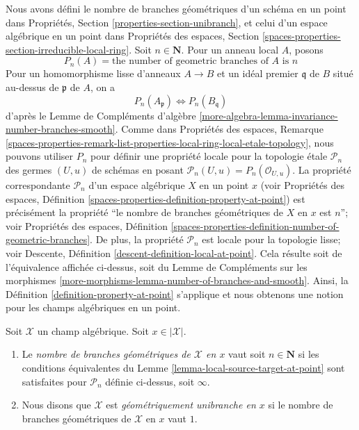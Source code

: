 \noindent
Nous avons défini le nombre de branches géométriques d'un schéma en un point
dans Propriétés, Section \ref{properties-section-unibranch},
et celui d'un espace algébrique en un point dans Propriétés des espaces, Section
\ref{spaces-properties-section-irreducible-local-ring}.
Soit $n \in \mathbf{N}$. Pour un anneau local $A$, posons
$$
P_n(A) = \text{the number of geometric branches of }A\text{ is }n
$$
Pour un homomorphisme lisse d'anneaux $A \to B$ et un idéal premier $\mathfrak q$
de $B$ situé au-dessus de $\mathfrak p$ de $A$, on a
$$
P_n(A_\mathfrak p) \Leftrightarrow P_n(B_\mathfrak q)
$$
d'après le Lemme de Compléments d'algèbre
\ref{more-algebra-lemma-invariance-number-branches-smooth}.
Comme dans Propriétés des espaces, Remarque
\ref{spaces-properties-remark-list-properties-local-ring-local-etale-topology},
nous pouvons utiliser $P_n$ pour définir une propriété locale pour la topologie \'etale $\mathcal{P}_n$
des germes $(U, u)$ de schémas en posant
$\mathcal{P}_n(U, u) = P_n(\mathcal{O}_{U, u})$.
La propriété correspondante $\mathcal{P}_n$
d'un espace algébrique $X$ en un point $x$
(voir Propriétés des espaces, Définition
\ref{spaces-properties-definition-property-at-point})
est précisément la propriété
``le nombre de branches géométriques de $X$ en $x$ est $n$''; voir
Propriétés des espaces, Définition
\ref{spaces-properties-definition-number-of-geometric-branches}.
De plus, la propriété $\mathcal{P}_n$ est locale pour la topologie lisse; voir
Descente, Définition \ref{descent-definition-local-at-point}.
Cela résulte soit de l'équivalence affichée ci-dessus,
soit du Lemme de Compléments sur les morphismes
\ref{more-morphisms-lemma-number-of-branches-and-smooth}.
Ainsi, la Définition \ref{definition-property-at-point}
s'applique et nous obtenons une notion pour les champs algébriques en un point.

\begin{definition}
\label{definition-number-of-geometric-branches}
Soit $\mathcal{X}$ un champ algébrique. Soit $x \in |\mathcal{X}|$.
\begin{enumerate}
\item Le {\it nombre de branches géométriques de $\mathcal{X}$ en $x$}
vaut soit $n \in \mathbf{N}$ si les conditions équivalentes du
Lemme \ref{lemma-local-source-target-at-point} sont satisfaites pour
$\mathcal{P}_n$ définie ci-dessus, soit $\infty$.
\item Nous disons que $\mathcal{X}$ est {\it géométriquement unibranche en $x$}
si le nombre de branches géométriques de $\mathcal{X}$ en $x$ vaut $1$.
\end{enumerate}
\end{definition}






